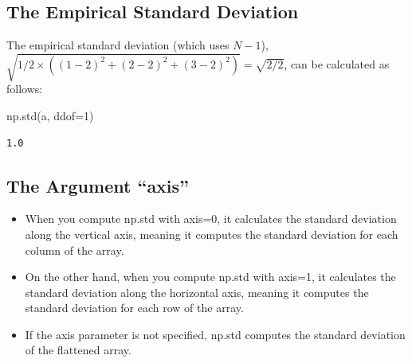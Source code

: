 \documentclass[
  letterpaper,
  DIV=11,
  numbers=noendperiod]{scrreprt}
\newenvironment{Shaded}{\begin{snugshade}}{\end{snugshade}}
\newcommand{\DecValTok}[1]{\textcolor[rgb]{0.68,0.00,0.00}{#1}}
\newcommand{\NormalTok}[1]{\textcolor[rgb]{0.00,0.23,0.31}{#1}}
\newcommand{\OperatorTok}[1]{\textcolor[rgb]{0.37,0.37,0.37}{#1}}
\providecommand{\tightlist}{%
  \setlength{\itemsep}{0pt}\setlength{\parskip}{0pt}}\usepackage{longtable,booktabs,array}
\begin{document}
\hypertarget{the-empirical-standard-deviation}{%
\subsection{The Empirical Standard
Deviation}\label{the-empirical-standard-deviation}}

The empirical standard deviation (which uses \(N-1\)),
\(\sqrt{1/2 \times \left( (1-2)^2 + (2-2)^2 + (3-2)^2 \right)} = \sqrt{2/2}\),
can be calculated as follows:

\begin{Shaded}
\begin{Highlighting}[]
\NormalTok{np.std(a, ddof}\OperatorTok{=}\DecValTok{1}\NormalTok{)}
\end{Highlighting}
\end{Shaded}

\begin{verbatim}
1.0
\end{verbatim}

\hypertarget{the-argument-axis}{%
\subsection{The Argument ``axis''}\label{the-argument-axis}}

\begin{tcolorbox}[enhanced jigsaw, arc=.35mm, colback=white, bottomtitle=1mm, toprule=.15mm, coltitle=black, titlerule=0mm, leftrule=.75mm, title=\textcolor{quarto-callout-note-color}{\faInfo}\hspace{0.5em}{Axes along which the standard deviation is computed}, opacitybacktitle=0.6, breakable, colbacktitle=quarto-callout-note-color!10!white, opacityback=0, toptitle=1mm, rightrule=.15mm, left=2mm, colframe=quarto-callout-note-color-frame, bottomrule=.15mm]

\begin{itemize}
\tightlist
\item
  When you compute np.std with axis=0, it calculates the standard
  deviation along the vertical axis, meaning it computes the standard
  deviation for each column of the array.
\item
  On the other hand, when you compute np.std with axis=1, it calculates
  the standard deviation along the horizontal axis, meaning it computes
  the standard deviation for each row of the array.
\item
  If the axis parameter is not specified, np.std computes the standard
  deviation of the flattened array.
\end{itemize}

\end{tcolorbox}
\end{document}
